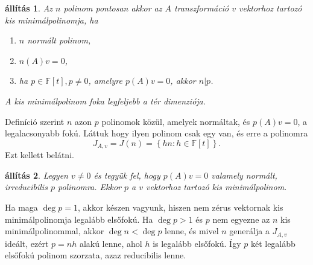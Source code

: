 \documentclass[a4paper, showtrims]{memoir}
\makeatletter
\renewenvironment{proof}[1][\proofname]
    {\par\pushQED{\qed}%
    \normalfont \topsep6\p@\@plus6\p@\relax
    \trivlist
    \item[\hskip\labelsep
        \itshape
    #1\@addpunct{:}]\ignorespaces}
    {\popQED\endtrivlist\@endpefalse}
\theoremstyle{plain}
\newtheorem{proposition}{állítás}[chapter]
\theoremstyle{remark}
\theoremstyle{definition}
\makeatother
\begin{document}
\begin{proposition}
	Az  $n$  polinom pontosan akkor az $A$ transzformáció $v$ vektorhoz tartozó kis minimálpolinomja, ha
	\begin{enumerate}
		\item $n$ normált polinom,
		\item $n\left( A \right)v=0$,
		\item ha $p\in\mathbb{F}\left[ t \right], p\neq 0$, amelyre
		      $p\left( A \right)v=0$, akkor $n|p$.
	\end{enumerate}
	A kis minimálpolinom foka legfeljebb a tér dimenziója.
\end{proposition}
\begin{proof}
	Definíció szerint $n$ azon $p$ polinomok közül,
	amelyek normáltak, és $p\left( A \right)v=0$, a legalacsonyabb fokú.
	Láttuk hogy ilyen polinom csak egy van, és erre a polinomra
	\[
		J_{A,v}=J\left( n \right)=\left\{ hn:h\in\mathbb{F}\left[ t \right] \right\}.
	\]
	Ezt kellett belátni.
\end{proof}
\begin{proposition}
	Legyen $v\neq 0$ és tegyük fel, hogy $p\left( A \right)v=0$ valamely normált,
	irreducibilis $p$ polinomra.
	Ekkor $p$ a $v$ vektorhoz tartozó kis minimálpolinom.
\end{proposition}
\begin{proof}
	Ha maga $\deg p=1$, akkor készen vagyunk, hiszen nem zérus vektornak kis minimálpolinomja legalább elsőfokú.
	Ha $\deg p>1$ és $p$ nem egyezne az $n$ kis minimálpolinommal,
	akkor $\deg n<\deg p$ lenne, és mivel $n$ generálja a $J_{A,v}$ ideált,
	ezért $p=nh$ alakú lenne, ahol $h$ is legalább elsőfokú.
	Így $p$ két legalább elsőfokú polinom szorzata, azaz reducibilis lenne.
\end{proof}
\end{document}
